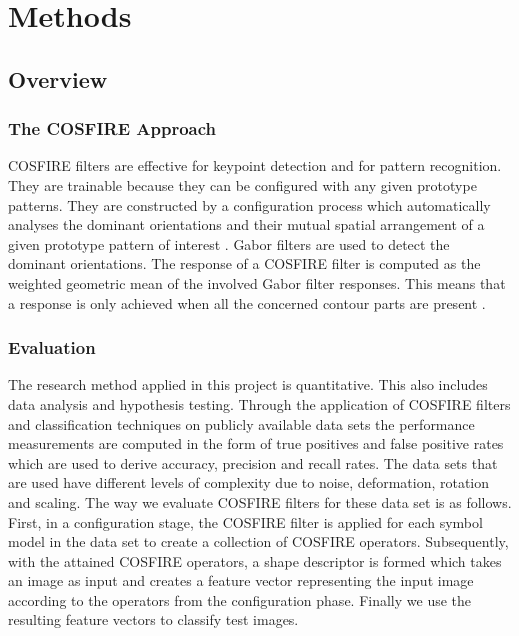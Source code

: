 \chapter{Methods}

\section {Overview}
\label{sec:overview}

\subsection{The COSFIRE Approach}
COSFIRE filters are effective for keypoint detection and for pattern recognition. They are trainable because they can be configured with any given prototype patterns. They are constructed by a configuration process which automatically analyses the dominant orientations and their mutual spatial arrangement of a given prototype pattern of interest \cite{Azzopardi_Petkov_2012}. Gabor filters are used to detect the dominant orientations. The response of a COSFIRE filter is computed as the weighted geometric mean of the involved Gabor filter responses. This means that a response is only achieved when all the concerned contour parts are present \cite{Azzopardi_Petkov_2012}.


\subsection{Evaluation}
The research method applied in this project is quantitative. This also includes data analysis and hypothesis testing. Through the application of COSFIRE filters and classification techniques on publicly available data sets the performance measurements are computed in the form of true positives and false positive rates which are used to derive accuracy, precision and recall rates. The data sets that are used have different levels of complexity due to noise, deformation, rotation and scaling. The way we evaluate COSFIRE filters for these data set is as follows. \\

First, in a configuration stage, the COSFIRE filter is applied for each symbol model in the data set to create a collection of COSFIRE operators. Subsequently, with the attained COSFIRE operators, a shape descriptor is formed which takes an image as input and creates a feature vector representing the input image according to the operators from the configuration phase. Finally we use the resulting feature vectors to classify test images. \\


